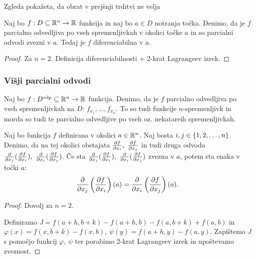 \begin{opomba}
    Zgleda pokažeta, da obrat v prejšnji trditvi ne velja
\end{opomba}

\begin{izrek}
    Naj bo $f: D \subseteq \mathbb{R}^n \to \mathbb{R}$ funkcija in naj bo $a \in D$ notranja točka. Denimo, da je $f$ parcialno odvedljiva po vseh spremenljivkah v okolici točke $a$ in so parcialni odvodi zvezni v $a$. Tedaj je $f$ diferenciabilna v $a$.
\end{izrek}

\begin{proof}
    Za $n=2$. Definicija diferenciabilnosti + 2-krat Lagrangeev izrek.
\end{proof}

\subsubsection{Višji parcialni odvodi}
Naj bo $f: D^{\text{odp}} \subseteq \mathbb{R}^n \to \mathbb{R}$ funkcija. Denimo, da je $f$ parcialno odvedljiva po vseh spremenljivkah na $D$: $f_{x_1}, \ldots, f_{x_n}$. To so tudi funkcije $n$-spremenljivk in morda so tudi te parcialno odvedljive po vseh oz. nekatareih spremenljivkah.

\begin{trditev}
    Naj bo funkcija $f$ definirana v okolici $a \in \mathbb{R}^n$. Naj bosta $i, j \in \left\{1, 2, \ldots, n\right\}$. Denimo, da na tej okolici obstajata $\frac{\partial f}{\partial x_i}, \ \frac{\partial f}{\partial x_j}$ in tudi druga odvoda $\frac{\partial}{\partial x_j} (\podv{f}{x_i}), \ \frac{\partial}{\partial x_i} (\podv{f}{x_j})$. Če sta $\frac{\partial}{\partial x_j} (\podv{f}{x_i}), \ \frac{\partial}{\partial x_i} (\podv{f}{x_j})$ zvezna v $a$, potem sta enaka v točki $a$: 
    $$\frac{\partial}{\partial x_j} \left(\frac{\partial f}{\partial x_i}\right)(a) = \frac{\partial}{\partial x_i} \left(\frac{\partial f}{\partial x_j}\right)(a).$$
\end{trditev}

\begin{proof}
    Dovolj za $n=2$. 
    
    Definiramo $J = f(a+h, b+k) - f(a+h, b) - f(a, b+k) + f(a,b)$ in $\varphi(x) = f(x, b+k) - f(x, b), \ \psi(y) = f(a+h, y) - f(a, y)$. Zapištemo $J$ s pomočjo funkcij $\varphi, \ \psi$ ter porabimo 2-krat Lagrangeev izrek in upoštevamo zveznost.
\end{proof}
